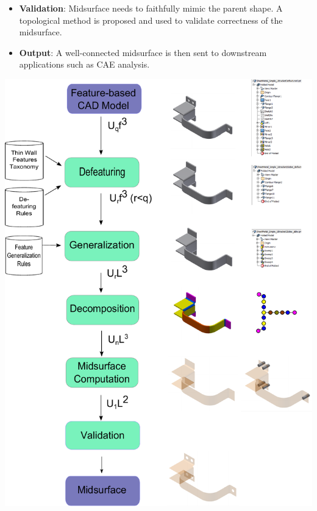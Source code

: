 \begin{minipage}[c]{0.98\linewidth}
\begin{minipage}[c]{0.57\linewidth}
\begin{itemize}[noitemsep,topsep=2pt,parsep=2pt,partopsep=2pt,leftmargin=*]
\item \textbf{Validation}:  Midsurface needs to faithfully mimic the parent shape. A topological method is proposed and used to validate correctness of the midsurface.

\item \textbf{Output}: A well-connected midsurface is then sent to downstream applications such as CAE analysis.
\end{itemize}

    \end{minipage}
    \hfill
    \begin{minipage}[c]{0.4\linewidth}
	\centering 
	\includegraphics[width=0.95\linewidth]{../Common/images/SystemArchitecture3.pdf}
	\label{fig_sysarch}
    \end{minipage}

\end{minipage}    

\bigskip

